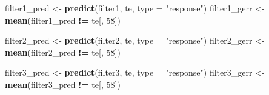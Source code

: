 \documentclass[
]{article}
\newenvironment{Shaded}{\begin{snugshade}}{\end{snugshade}}
\newcommand{\AttributeTok}[1]{\textcolor[rgb]{0.13,0.29,0.53}{#1}}
\newcommand{\DecValTok}[1]{\textcolor[rgb]{0.00,0.00,0.81}{#1}}
\newcommand{\FunctionTok}[1]{\textcolor[rgb]{0.13,0.29,0.53}{\textbf{#1}}}
\newcommand{\NormalTok}[1]{#1}
\newcommand{\OtherTok}[1]{\textcolor[rgb]{0.56,0.35,0.01}{#1}}
\newcommand{\SpecialCharTok}[1]{\textcolor[rgb]{0.81,0.36,0.00}{\textbf{#1}}}
\newcommand{\StringTok}[1]{\textcolor[rgb]{0.31,0.60,0.02}{#1}}
\begin{document}
\begin{Shaded}
\begin{Highlighting}[]
\NormalTok{filter1\_pred }\OtherTok{\textless{}{-}} \FunctionTok{predict}\NormalTok{(filter1, te, }\AttributeTok{type =} \StringTok{"response"}\NormalTok{)}
\NormalTok{filter1\_gerr }\OtherTok{\textless{}{-}} \FunctionTok{mean}\NormalTok{(filter1\_pred }\SpecialCharTok{!=}\NormalTok{ te[, }\DecValTok{58}\NormalTok{])}

\NormalTok{filter2\_pred }\OtherTok{\textless{}{-}} \FunctionTok{predict}\NormalTok{(filter2, te, }\AttributeTok{type =} \StringTok{"response"}\NormalTok{)}
\NormalTok{filter2\_gerr }\OtherTok{\textless{}{-}} \FunctionTok{mean}\NormalTok{(filter2\_pred }\SpecialCharTok{!=}\NormalTok{ te[, }\DecValTok{58}\NormalTok{])}

\NormalTok{filter3\_pred }\OtherTok{\textless{}{-}} \FunctionTok{predict}\NormalTok{(filter3, te, }\AttributeTok{type =} \StringTok{"response"}\NormalTok{)}
\NormalTok{filter3\_gerr }\OtherTok{\textless{}{-}} \FunctionTok{mean}\NormalTok{(filter3\_pred }\SpecialCharTok{!=}\NormalTok{ te[, }\DecValTok{58}\NormalTok{])}


\end{Highlighting}
\end{Shaded}
\end{document}

